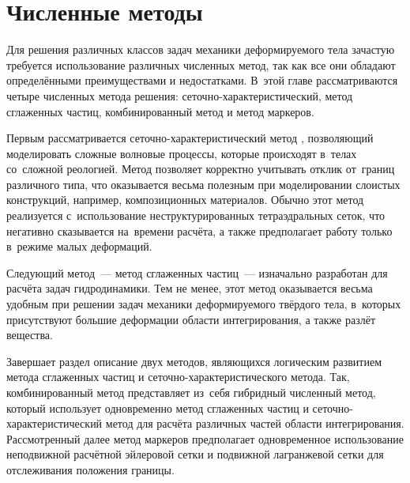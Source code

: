 \documentclass[thesis.tex]{subfiles}
\begin{document}
\section{Численные методы}

Для решения различных классов задач механики деформируемого тела зачастую требуется использование различных численных
метод, так как все они обладают определёнными преимуществами и недостатками. В~этой главе рассматриваются четыре
численных метода решения: се\-точ\-но-характеристический, метод сглаженных частиц, комбинированный метод и метод маркеров.

Первым рассматривается сеточно-характеристический метод \cite{петров1984численное}, позволяющий моделировать сложные
волновые процессы, которые происходят в~телах со~сложной реологией. Метод позволяет корректно учитывать отклик от~границ
различного типа, что оказывается весьма полезным при моделировании слоистых конструкций, например, композиционных
материалов. Обычно этот метод реализуется с~использование неструктурированных тетраэдральных сеток, что негативно
сказывается на~времени расчёта, а также предполагает работу только в~режиме малых деформаций.

Следующий метод~--- метод сглаженных частиц~--- изначально разработан \cite{monaghan1988introduction} для расчёта задач
гидродинамики. Тем не менее, этот метод оказывается весьма удобным при решении задач механики деформируемого твёрдого
тела, в~которых присутствуют большие деформации области интегрирования, а также разлёт вещества.

Завершает раздел описание двух методов, являющихся логическим развитием метода сглаженных частиц и
сеточно-характеристического метода. Так, комбинированный метод \cite{петров2014схм} представляет из~себя
гибридный численный метод, который использует одновременно метод сглаженных частиц и сеточно-характеристический метод
для расчёта различных частей области интегрирования. Рассмотренный далее метод маркеров предполагает одновременное
использование неподвижной расчётной эйлеровой сетки и подвижной лагранжевой сетки для отслеживания положения границы.





\end{document}

